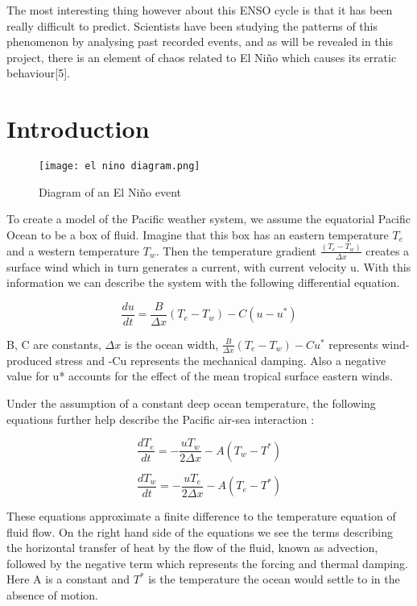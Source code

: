 \documentclass{article}
\begin{document}
The most interesting thing however about this ENSO cycle is that it has been really difficult to predict. Scientists have been studying the patterns of this phenomenon by analysing past recorded events, and as will be revealed in this project, there is an element of chaos related to El Niño which causes its erratic behaviour[5]. 

\section{Introduction}

\begin{figure}[h]
\centering
\texttt{[image: el nino diagram.png]}
\caption{\label{fig:Diagram}Diagram of an El Niño event}
\end{figure}

To create a model of the Pacific weather system, we assume the equatorial Pacific Ocean to be a box of fluid. Imagine that this box has an eastern temperature $T_e$ and a western temperature $T_w$. Then the temperature gradient $\frac{(T_e - T_w)}{\Delta x}$ creates a surface wind which in turn generates a current, with current velocity u. With this information we can describe the system with the following differential equation.

$$\frac{du}{dt} = \frac{B}{\Delta x} (T_e - T_w) - C(u - u^*)$$

B, C are constants, $\Delta x$ is the ocean width, $\frac{B}{\Delta x} (T_e - T_w) - Cu^* $ represents wind-produced stress and -Cu represents the mechanical damping. Also a negative value for u* accounts for the effect of the mean tropical surface eastern winds. 

Under the assumption of a constant deep ocean temperature, the following equations further help describe the Pacific air-sea interaction : 

$$\frac{dT_e}{dt} = - \frac{uT_w}{2 \Delta x} - A(T_w - T^*)$$

$$\frac{dT_w}{dt} = - \frac{uT_e}{2 \Delta x} - A(T_e - T^*)$$

These equations approximate a finite difference to the temperature equation of fluid flow. On the right hand side of the equations we see the terms describing the horizontal transfer of heat by the flow of the fluid, known as advection, followed by the negative term which represents the forcing and thermal damping. Here A is a constant and $T^*$ is the temperature the ocean would settle to in the absence of motion. 
\end{document}
